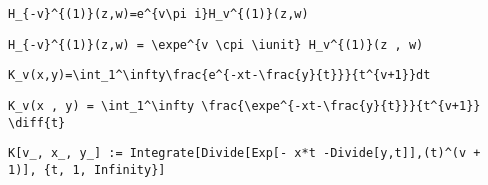 \newsavebox\DQT
\begin{lrbox}{\DQT}
 \begin{minipage}[t]{0.82\textwidth}
  \lstinline[language={[latex]TeX},mathescape,breaklines=true]"H_{-v}^{(1)}(z,w)=e^{v\pi i}H_v^{(1)}(z,w)"
 \end{minipage}
\end{lrbox}
\newsavebox\DQST
\begin{lrbox}{\DQST}
 \begin{minipage}[t]{0.82\textwidth}
  \lstinline[language={[latex]TeX},mathescape,breaklines=true]"H_{-v}^{(1)}(z,w) = \expe^{v \cpi \iunit} H_v^{(1)}(z , w)"
 \end{minipage}
\end{lrbox}
\newsavebox\DQMM
\begin{lrbox}{\DQMM}
 \begin{minipage}[t]{0.82\textwidth}
  \lstinline[language={[latex]TeX},mathescape,breaklines=true]""
 \end{minipage}
\end{lrbox}
\newsavebox\DQMA
\begin{lrbox}{\DQMA}
 \begin{minipage}[t]{0.82\textwidth}
  \lstinline[language={[latex]TeX},mathescape,breaklines=true]""
 \end{minipage}
\end{lrbox}
\newsavebox\DRT
\begin{lrbox}{\DRT}
 \begin{minipage}[t]{0.82\textwidth}
  \lstinline[language={[latex]TeX},mathescape,breaklines=true]"K_v(x,y)=\int_1^\infty\frac{e^{-xt-\frac{y}{t}}}{t^{v+1}}dt"
 \end{minipage}
\end{lrbox}
\newsavebox\DRST
\begin{lrbox}{\DRST}
 \begin{minipage}[t]{0.82\textwidth}
  \lstinline[language={[latex]TeX},mathescape,breaklines=true]"K_v(x , y) = \int_1^\infty \frac{\expe^{-xt-\frac{y}{t}}}{t^{v+1}} \diff{t}"
 \end{minipage}
\end{lrbox}
\newsavebox\DRMM
\begin{lrbox}{\DRMM}
 \begin{minipage}[t]{0.82\textwidth}
  \lstinline[language={[latex]TeX},mathescape,breaklines=true]"K[v_, x_, y_] := Integrate[Divide[Exp[- x*t -Divide[y,t]],(t)^(v + 1)], {t, 1, Infinity}]"
 \end{minipage}
\end{lrbox}
\newsavebox\DRMA
\begin{lrbox}{\DRMA}
 \begin{minipage}[t]{0.82\textwidth}
  \lstinline[language={[latex]TeX},mathescape,breaklines=true]""
 \end{minipage}
\end{lrbox}
